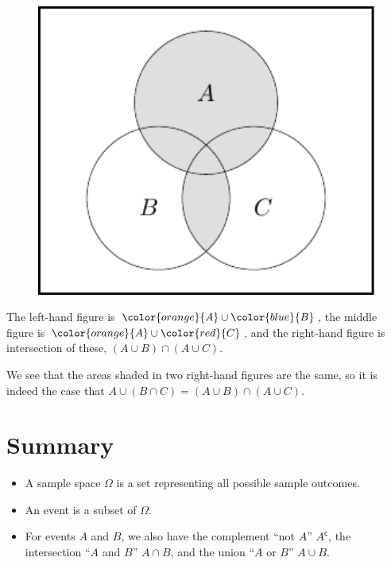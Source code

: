 \documentclass[
  letterpaper,
]{report}
\providecommand{\tightlist}{%
  \setlength{\itemsep}{0pt}\setlength{\parskip}{0pt}}\usepackage{longtable,booktabs,array}
\theoremstyle{definition}
\theoremstyle{definition}
\theoremstyle{remark}
\begin{document}
~

\begin{figure}

{\centering \includegraphics[width=1\textwidth,height=\textheight]{sections/L03-events_files/figure-pdf/dist6-1.pdf}

}

\end{figure}

The left-hand figure is \(\color{orange}{A} \cup \color{blue}{B}\), the
middle figure is \(\color{orange}{A}\cup \color{red}{C}\), and the
right-hand figure is intersection of these, \((A\cup B)\cap (A\cup C)\).

We see that the areas shaded in two right-hand figures are the same, so
it is indeed the case that
\(A\cup (B\cap C) = (A\cup B)\cap (A\cup C)\).

\hypertarget{summary-L03}{%
\section*{Summary}\label{summary-L03}}


\begin{itemize}
\tightlist
\item
  A sample space \(\Omega\) is a set representing all possible sample
  outcomes.
\item
  An event is a subset of \(\Omega\).
\item
  For events \(A\) and \(B\), we also have the complement ``not \(A\)''
  \(A^\mathsf{c}\), the intersection ``\(A\) and \(B\)'' \(A \cap B\),
  and the union ``\(A\) or \(B\)'' \(A \cup B\).
\end{itemize}
\end{document}
